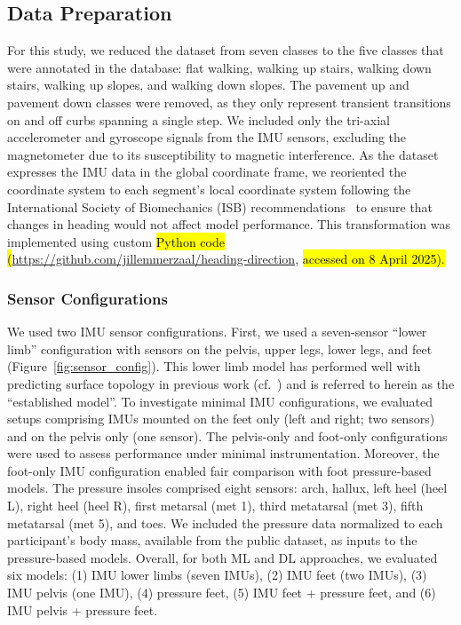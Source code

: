 \documentclass[sensors,article,accept,pdftex,moreauthors]{Definitions/mdpi}
\begin{document}
\subsection{Data Preparation}
For this study, we reduced the dataset from seven classes to the five classes that were annotated in the database: \textcolor{revision}{flat walking}, walking up stairs, walking down stairs, walking up slopes, and walking down slopes. The pavement up and pavement down classes were removed, as they only represent transient transitions on and off curbs spanning a single step. 
We included only the tri-axial accelerometer and gyroscope \textcolor{revision}{signals} from the IMU sensors, excluding the magnetometer due to its susceptibility to magnetic interference. As the dataset expresses the IMU data in the global coordinate frame, we reoriented the coordinate system to each \textcolor{revision}{segment's} local coordinate system \textcolor{revision}{following the International Society of Biomechanics (ISB) recommendations~\cite{wu2002isb}} to ensure that changes in heading would not affect model performance. This transformation was implemented using custom \hl{Python code (}\url{https://github.com/jillemmerzaal/heading-direction}, \hl{accessed on 8 April  2025).} %

\subsubsection{Sensor Configurations}
We used two IMU sensor configurations. First, we used a seven-sensor ``lower limb'' configuration with sensors on the pelvis, upper legs, lower legs, and feet (Figure~\ref{fig:sensor_config}). This lower limb model has performed well with predicting surface topology in previous work (cf.~\cite{chauhan2025classifying}) and is referred to herein as the ``established model''. {To investigate minimal IMU configurations, we  evaluated setups comprising IMUs mounted on the feet only (left and right; two sensors) and on the pelvis only (one sensor). The pelvis-only and foot-only configurations were used to assess performance under minimal instrumentation. Moreover, the foot-only IMU configuration enabled fair comparison with foot pressure-based models.} The pressure insoles {comprised} eight sensors: arch, hallux, left heel (heel L), right heel (heel R), first metarsal (met 1), third metatarsal (met 3), fifth metatarsal (met 5), and toes. We included the  pressure data normalized to each participant's body mass{, available from the public dataset, as inputs to the pressure-based models}. 
{Overall, for both ML and DL approaches, we evaluated six models: (1) IMU lower limbs (seven IMUs), (2) IMU feet (two IMUs), (3) IMU pelvis (one IMU), (4) pressure feet, (5) IMU feet + pressure feet, and (6) IMU pelvis + pressure feet.}
\end{document}

